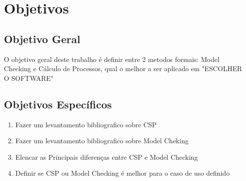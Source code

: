 \section{Objetivos}

\subsection{Objetivo Geral}

O objetivo geral deste trabalho é definir entre 2 metodos formais: Model Checking e Cálculo de Processos, qual o melhor a ser aplicado em "ESCOLHER O SOFTWARE"


\subsection{Objetivos Específicos}
\begin{enumerate}
    \item Fazer um levantamento bibliografico sobre CSP
    \item Fazer um levantamento bibliografico sobre Model Cheking
    \item Elencar as Principais diferenças entre CSP e Model Checking
    \item Definir se CSP ou Model Checking é melhor para o caso de uso definido
\end{enumerate}



